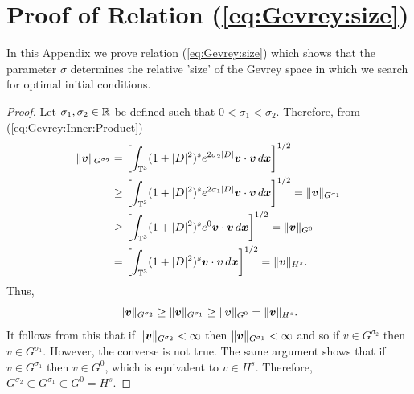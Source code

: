 \chapter{Proof of Relation (\ref{eq:Gevrey:size})}
\label{app:Gevrey:size}

In this Appendix we prove relation (\ref{eq:Gevrey:size}) which shows that the parameter $\sigma$ determines the relative 'size' of the Gevrey space in which we search for optimal initial conditions.

\begin{proof}
Let $\sigma_1, \sigma_2\in \mathbb{R}$ be defined such that $0 < \sigma_1 < \sigma_2$. Therefore, from (\ref{eq:Gevrey:Inner:Product})
\begin{align*}
\notag
\|\boldsymbol v\|_{G^{\sigma_2}} &=\left[ \int_{\mathbb{T}^3}(1+|D|^2)^{s}e^{2\sigma_2 |D|}\boldsymbol v\cdot \boldsymbol v \, d\boldsymbol x\right]^{1/2}\\
\notag
&\geq \left[ \int_{\mathbb{T}^3}(1+|D|^2)^{s}e^{2 \sigma_1 |D|}\boldsymbol v\cdot \boldsymbol v \, d\boldsymbol x\right]^{1/2} = \|\boldsymbol v\|_{G^{\sigma_1}} \\
\notag
&\geq \left[ \int_{\mathbb{T}^3}(1+|D|^2)^{s}e^{0}\boldsymbol v\cdot \boldsymbol v \, d\boldsymbol x\right]^{1/2} = \|\boldsymbol v\|_{G^{0}} \\
&= \left[ \int_{\mathbb{T}^3}(1+|D|^2)^{s}\boldsymbol v\cdot \boldsymbol v \, d\boldsymbol x\right]^{1/2}= \|\boldsymbol v\|_{H^s}.
\end{align*}
\noindent Thus,
\begin{equation*}
\|\boldsymbol v\|_{G^{\sigma_2}} \geq \|\boldsymbol v\|_{G^{\sigma_1}} \geq \|\boldsymbol v\|_{G^{0}} = \|\boldsymbol v\|_{H^s}.
\end{equation*}
\noindent It follows from this that if $\|\boldsymbol v\|_{G^{\sigma_2}} < \infty$ then $\|\boldsymbol v\|_{G^{\sigma_1}} < \infty$ and so if $v\in G^{\sigma_2}$ then $v\in G^{\sigma_1}$. However, the converse is not true. The same argument shows that if $v\in G^{\sigma_1}$ then $v\in G^0$, which is equivalent to $v\in H^s$. Therefore, $G^{\sigma_2} \subset G^{\sigma_1} \subset G^0 = H^s.$


\end{proof}

